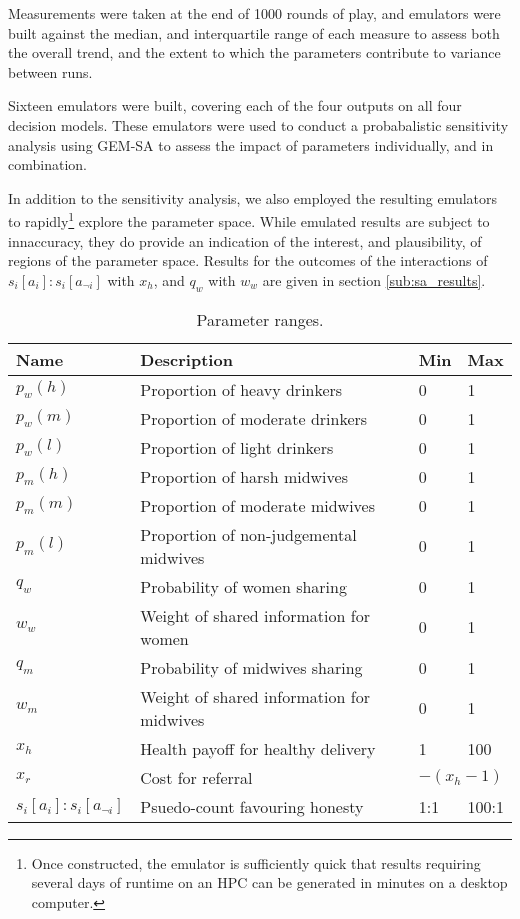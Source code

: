 Measurements were taken at the end of 1000 rounds of play, and emulators were built against the median, and interquartile range of each measure to assess both the overall trend, and the extent to which the parameters contribute to variance between runs.

Sixteen emulators were built, covering each of the four outputs on all four decision models. These emulators were used to conduct a probabalistic sensitivity analysis using \ac{GEM-SA} to assess the impact of parameters individually, and in combination.

In addition to the sensitivity analysis, we also employed the resulting emulators to rapidly\footnote{Once constructed, the emulator is sufficiently quick that results requiring several days of runtime on an HPC can be generated in minutes on a desktop computer.} explore the parameter space. While emulated results are subject to innaccuracy, they do provide an indication of the interest, and plausibility, of regions of the parameter space. Results for the outcomes of the interactions of \(s_{i}[a_{i}]:s_{i}[a_{\neg i}]\) with \(x_{h}\), and \(q_{w}\) with \(w_{w}\) are given in section \ref{sub:sa_results}.

\begin{table}
\center
\begin{tabular} {|l | l | l| l|}
\hline
Name & Description & Min & Max \\ \hline
\(p_{w}(h)\) & Proportion of heavy drinkers & 0 & 1 \\ \hline
\(p_{w}(m)\) & Proportion of moderate drinkers & 0 & 1 \\ \hline
\(p_{w}(l)\) & Proportion of light drinkers & 0 & 1 \\ \hline
\(p_{m}(h)\) & Proportion of harsh midwives & 0 & 1 \\ \hline
\(p_{m}(m)\) & Proportion of moderate midwives & 0 & 1 \\ \hline
\(p_{m}(l)\) & Proportion of non-judgemental midwives & 0 & 1 \\ \hline
\(q_{w}\) & Probability of women sharing & 0 & 1 \\ \hline
\(w_{w}\) & Weight of shared information for women & 0 & 1 \\ \hline
\(q_{m}\) & Probability of midwives sharing & 0 & 1 \\ \hline
\(w_{m}\) & Weight of shared information for midwives & 0 & 1 \\ \hline
\(x_{h}\) & Health payoff for healthy delivery & 1 & 100 \\ \hline
\(x_{r}\) & Cost for referral & \multicolumn{2}{l|}{\(-(x_{h} - 1)\)} \\ \hline
\(s_{i}[a_{i}]:s_{i}[a_{\neg i}]\) & Psuedo-count favouring honesty & 1:1 & 100:1 \\ \hline
\end{tabular}
\caption[Table caption text]{Parameter ranges. \label{tab:sa_params}}
\end{table}